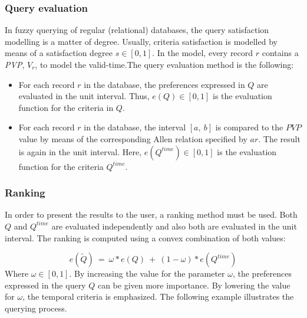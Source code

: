 \subsubsection{Query evaluation}
In fuzzy querying of regular (relational) databases, the query satisfaction modelling is a matter of degree. Usually, criteria satisfaction is modelled by means of a satisfaction degree $s \in \left[ 0, 1\right]$. In the model, every record $r$ contains a \emph{PVP}, $V_r$, to model the valid-time.The query evaluation method is the following:
\begin{itemize}
\item
For each record $r$ in the database, the preferences expressed in $Q$ are evaluated in the unit interval. Thus, $e(Q) \in \left[0, 1\right]$ is the evaluation function for the criteria in $Q$.
\item
For each record $r$ in the database, the interval $ \left[a, \ b \right]$ is compared to the $PVP$ value by means of the corresponding Allen relation specified by $ar$. The result is again in the unit interval. Here, $e(Q^{time}) \in \left[0, 1 \right]$ is the evaluation function for the criteria $Q^{time}$.
\end{itemize}


\subsubsection{Ranking}
In order to present the results to the user, a ranking method must be used. Both $Q$ and $Q^{time}$ are evaluated independently and also both are evaluated in the unit interval. The ranking is computed using a convex combination of both values:

\begin{equation}
e(\tilde{Q})\ =\ \omega*e(Q)\ +\ (1-\omega)*e(Q^{time})
\end{equation}
Where $\omega \in \left[0, 1 \right]$. By increasing the value for the parameter $\omega$, the preferences expressed in the query $Q$ can be given more importance. By lowering the value for $\omega$, the temporal criteria is emphasized.
The following example illustrates the querying process.


